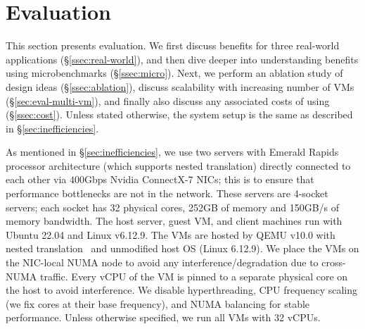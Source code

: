 \section{Evaluation}
\label{sec:eval}


This section presents {\name} evaluation. We first discuss {\name} benefits for three real-world applications (\S\ref{ssec:real-world}), and then dive deeper into understanding {\name} benefits using microbenchmarks (\S\ref{ssec:micro}). Next, we perform an ablation study of {\name} design ideas (\S\ref{ssec:ablation}), discuss {\name} scalability with increasing number of VMs (\S\ref{sec:eval-multi-vm}), and finally also discuss any associated costs of using {\name} (\S\ref{ssec:cost}). 
Unless stated otherwise, the system setup is the same as described in \S\ref{sec:inefficiencies}. 

As mentioned in \S\ref{sec:inefficiencies}, we use two servers with Emerald Rapids processor architecture (which supports nested translation) directly connected to each other via $400$Gbps Nvidia ConnectX-7 NICs; this is to ensure that performance bottlenecks are not in the network. 
These servers are 4-socket servers; each socket has
  32 physical cores, 252GB of memory and 150GB/s of memory bandwidth.
The host server, guest VM, and client machines run with Ubuntu 22.04 and Linux v6.12.9. 
The VMs are hosted by QEMU v10.0 with nested translation~\cite{yiliu1765qemu}
and unmodified host OS (Linux 6.12.9).
We place the VMs on the NIC-local NUMA node to avoid any interference/degradation 
  due to cross-NUMA traffic.
Every vCPU of the VM is pinned to a separate physical core on the host to avoid interference. 
  We disable hyperthreading, CPU frequency scaling (we fix cores at their base frequency), and NUMA balancing for stable performance. 
Unless otherwise specified, we run all VMs with 32 vCPUs.

